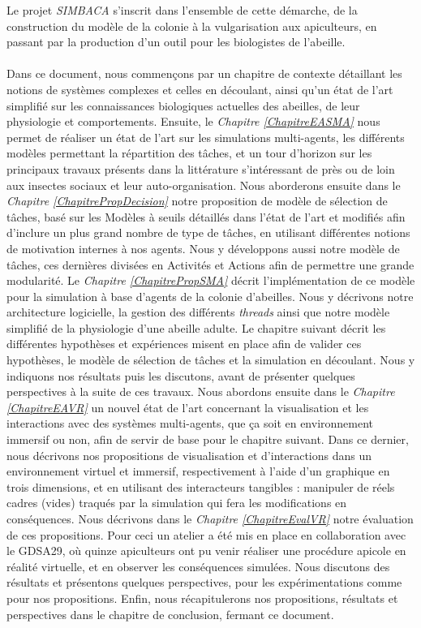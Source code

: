 	Le projet \textit{SIMBACA} s'inscrit dans l'ensemble de cette démarche, de la construction du modèle de la colonie à la vulgarisation aux apiculteurs, en passant par la production d'un outil pour les biologistes de l'abeille.
	
	\paragraph{}
	Dans ce document, nous commençons par un chapitre de contexte détaillant les notions de systèmes complexes et celles en découlant, ainsi qu'un état de l'art simplifié sur les connaissances biologiques actuelles des abeilles, de leur physiologie et comportements.
	 Ensuite, le \textit{Chapitre \ref{ChapitreEASMA}} nous permet de réaliser un état de l'art sur les simulations multi-agents, les différents modèles permettant la répartition des tâches, et un tour d'horizon sur les principaux travaux présents dans la littérature s'intéressant de près ou de loin aux insectes sociaux et leur auto-organisation. 
	 Nous aborderons ensuite dans le \textit{Chapitre \ref{ChapitrePropDecision}} notre proposition de modèle de sélection de tâches, basé sur les Modèles à seuils détaillés dans l'état de l'art et modifiés afin d'inclure un plus grand nombre de type de tâches, en utilisant différentes notions de motivation internes à nos agents. Nous y développons aussi notre modèle de tâches, ces dernières divisées en Activités et Actions afin de permettre une grande modularité. 
	 Le \textit{Chapitre \ref{ChapitrePropSMA}} décrit l'implémentation de ce modèle pour la simulation à base d'agents de la colonie d'abeilles. Nous y décrivons notre architecture logicielle, la gestion des différents \textit{threads} ainsi que notre modèle simplifié de la physiologie d'une abeille adulte. 
	 Le chapitre suivant décrit les différentes hypothèses et expériences misent en place afin de valider ces hypothèses, le modèle de sélection de tâches et la simulation en découlant. Nous y indiquons nos résultats puis les discutons, avant de présenter quelques perspectives à la suite de ces travaux. 
	 Nous abordons ensuite dans le \textit{Chapitre \ref{ChapitreEAVR}} un nouvel état de l'art concernant la visualisation et les interactions avec des systèmes multi-agents, que ça soit en environnement immersif ou non, afin de servir de base pour le chapitre suivant. 
	 Dans ce dernier, nous décrivons nos propositions de visualisation et d'interactions dans un environnement virtuel et immersif, respectivement à l'aide d'un graphique en trois dimensions, et en utilisant des interacteurs tangibles : manipuler de réels cadres (vides) traqués par la simulation qui fera les modifications en conséquences. 
	 Nous décrivons dans le \textit{Chapitre \ref{ChapitreEvalVR}} notre évaluation de ces propositions. Pour ceci un atelier a été mis en place en collaboration avec le GDSA29, où quinze apiculteurs ont pu venir réaliser une procédure apicole en réalité virtuelle, et en observer les conséquences simulées. Nous discutons des résultats et présentons quelques perspectives, pour les expérimentations comme pour nos propositions. 
	 Enfin, nous récapitulerons nos propositions, résultats et perspectives dans le chapitre de conclusion, fermant ce document.